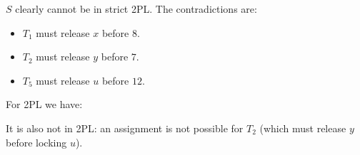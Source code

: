 $S$ clearly cannot be in strict 2PL. The contradictions are:
\begin{itemize}
    \item $T_1$ must release $x$ before $8$. 
    \item $T_2$ must release $y$ before $7$.
    \item $T_5$ must release $u$ before $12$.
\end{itemize}
For 2PL we have:
\begin{table}[H]
    \centering
\end{table}
It is also not in 2PL: an assignment is not possible for $T_2$ (which must release $y$ before locking $u$).